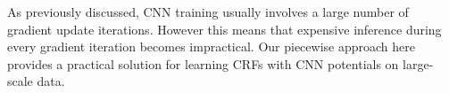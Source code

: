  As previously discussed, CNN training usually involves a large number of gradient update iterations.  However this means that expensive inference during every gradient iteration becomes impractical.  Our piecewise approach here provides a practical solution for learning CRFs with CNN potentials on large-scale data.






